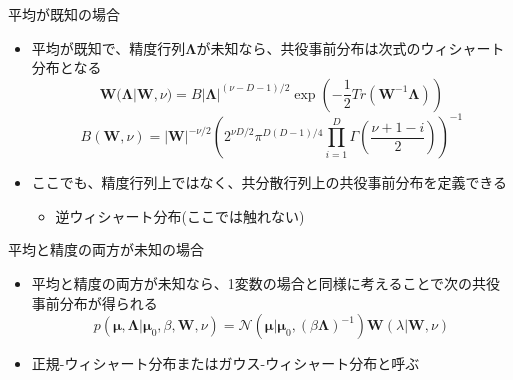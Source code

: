  \begin{frame}{平均が既知の場合}
   \begin{itemize}
    \item \alert{平均が既知}で、精度行列$\bm{\Lambda}$が未知なら、共役事前分布は次式のウィシャート分布となる
          \begin{equation}
           \bm{W}(\bm{\Lambda}|\bm{W},\nu) = B|\bm{\Lambda}|^{(\nu-D-1)/2}\exp\left(-\frac{1}{2}Tr(\bm{W}^{-1}\bm{\Lambda})\right)
          \end{equation}
          \begin{equation}
           B(\bm{W},\nu) = |\bm{W}|^{-\nu/2}\left(2^{\nu D/2}\pi^{D(D-1)/4}\prod_{i=1}^D\Gamma\left(\frac{\nu+1-i}{2}\right)\right)^{-1}
          \end{equation}
    \item ここでも、精度行列上ではなく、共分散行列上の共役事前分布を定義できる
          \begin{itemize}
           \item 逆ウィシャート分布(ここでは触れない)
          \end{itemize}
   \end{itemize}
  \end{frame}

  \begin{frame}{平均と精度の両方が未知の場合}
   \begin{itemize}
    \item \alert{平均と精度の両方が未知}なら、1変数の場合と同様に考えることで次の共役事前分布が得られる
          \begin{equation}
           p(\bm{\mu},\bm{\Lambda}|\bm{\mu}_0,\beta,\bm{W},\nu) = \mathcal{N}(\bm{\mu}|\bm{\mu}_0,(\beta\bm{\Lambda})^{-1})\bm{W}(\lambda|\bm{W},\nu)
          \end{equation}
    \item \alert{正規-ウィシャート分布}または\alert{ガウス-ウィシャート分布}と呼ぶ
   \end{itemize}
  \end{frame}
